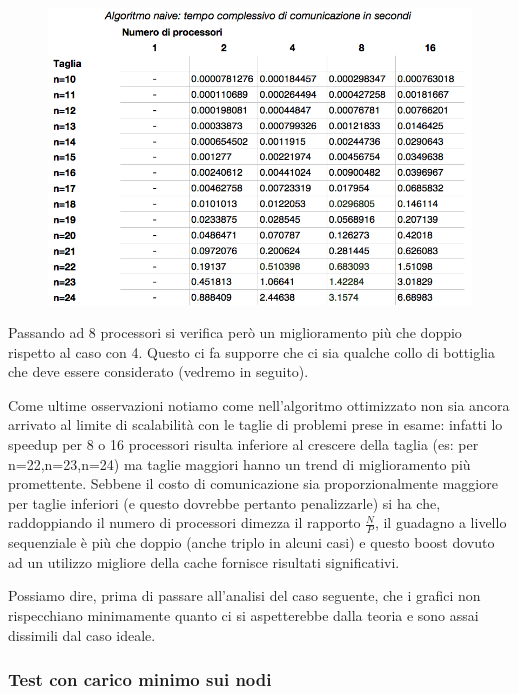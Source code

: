 \documentclass[12pt,a4paper,oneside,openright]{article}
\begin{document}
\begin{figure}[H] 
  \centering
      \includegraphics[width=\textwidth]{immagini/algoritmo_normale_tempo_comunicazione_senza_rete}
\end{figure}

Passando ad 8 processori si verifica però un miglioramento più che doppio rispetto al caso con 4. Questo ci fa supporre che ci sia qualche collo di bottiglia che deve essere considerato (vedremo in seguito).

Come ultime osservazioni notiamo come nell'algoritmo ottimizzato non sia ancora arrivato al limite di scalabilità con le taglie di problemi prese in esame: infatti lo speedup per 8 o 16 processori risulta inferiore al crescere della taglia (es:  per n=22,n=23,n=24) ma taglie maggiori hanno un trend di miglioramento più promettente. Sebbene il costo di comunicazione sia proporzionalmente maggiore per taglie inferiori (e questo dovrebbe pertanto penalizzarle) si ha che, raddoppiando il numero di processori dimezza il rapporto $\frac{N}{P}$, il guadagno a livello sequenziale è più che doppio (anche triplo in alcuni casi) e questo boost dovuto ad un utilizzo migliore della cache fornisce risultati significativi.

Possiamo dire, prima di passare all'analisi del caso seguente, che i grafici non rispecchiano minimamente quanto ci si aspetterebbe dalla teoria e sono assai dissimili dal caso ideale.

\subsubsection{Test con carico minimo sui nodi}
\end{document}
